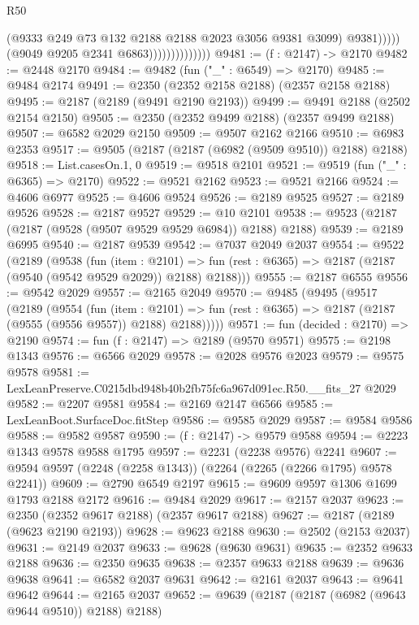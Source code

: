 \begin{lexlean}{R50}
\begin{coremodule}
                                        (@9333 @249 @73 @132 @2188 @2188 @2023 @3056 @9381 @3099)
                                        @9381)))))
                              (@9049 @9205 @2341 @6863))))))))))))))
@9481 := (f : @2147) -> @2170
@9482 := @2448 @2170
@9484 := @9482 (fun ("_" : @6549) => @2170)
@9485 := @9484 @2174
@9491 := @2350 (@2352 @2158 @2188) (@2357 @2158 @2188)
@9495 := @2187 (@2189 (@9491 @2190 @2193))
@9499 := @9491 @2188 (@2502 @2154 @2150)
@9505 := @2350 (@2352 @9499 @2188) (@2357 @9499 @2188)
@9507 := @6582 @2029 @2150
@9509 := @9507 @2162 @2166
@9510 := @6983 @2353
@9517 := @9505 (@2187 (@2187 (@6982 (@9509 @9510)) @2188) @2188)
@9518 := List.casesOn.{1, 0}
@9519 := @9518 @2101
@9521 := @9519 (fun ("_" : @6365) => @2170)
@9522 := @9521 @2162
@9523 := @9521 @2166
@9524 := @4606 @6977
@9525 := @4606 @9524
@9526 := @2189 @9525
@9527 := @2189 @9526
@9528 := @2187 @9527
@9529 := @10 @2101
@9538 := @9523 (@2187 (@2187 (@9528 (@9507 @9529 @9529 @6984)) @2188) @2188)
@9539 := @2189 @6995
@9540 := @2187 @9539
@9542 := @7037 @2049 @2037
@9554 := @9522
    (@2189
      (@9538
        (fun (item : @2101) =>
        fun (rest : @6365) => @2187 (@2187 (@9540 (@9542 @9529 @2029)) @2188) @2188)))
@9555 := @2187 @6555
@9556 := @9542 @2029
@9557 := @2165 @2049
@9570 := @9485
    (@9495
      (@9517
        (@2189
          (@9554
            (fun (item : @2101) =>
            fun (rest : @6365) => @2187 (@2187 (@9555 (@9556 @9557)) @2188) @2188)))))
@9571 := fun (decided : @2170) => @2190
@9574 := fun (f : @2147) => @2189 (@9570 @9571)
@9575 := @2198 @1343
@9576 := @6566 @2029
@9578 := @2028 @9576 @2023
@9579 := @9575 @9578
@9581 := LexLeanPreserve.C0215dbd948b40b2fb75fc6a967d091ec.R50.__fits_27 @2029
@9582 := @2207 @9581
@9584 := @2169 @2147 @6566
@9585 := LexLeanBoot.SurfaceDoc.fitStep
@9586 := @9585 @2029
@9587 := @9584 @9586
@9588 := @9582 @9587
@9590 := (f : @2147) -> @9579 @9588
@9594 := @2223 @1343 @9578 @9588 @1795
@9597 := @2231 (@2238 @9576) @2241
@9607 := @9594 @9597 (@2248 (@2258 @1343)) (@2264 (@2265 (@2266 @1795) @9578 @2241))
@9609 := @2790 @6549 @2197
@9615 := @9609 @9597 @1306 @1699 @1793 @2188 @2172
@9616 := @9484 @2029
@9617 := @2157 @2037
@9623 := @2350 (@2352 @9617 @2188) (@2357 @9617 @2188)
@9627 := @2187 (@2189 (@9623 @2190 @2193))
@9628 := @9623 @2188
@9630 := @2502 (@2153 @2037)
@9631 := @2149 @2037
@9633 := @9628 (@9630 @9631)
@9635 := @2352 @9633 @2188
@9636 := @2350 @9635
@9638 := @2357 @9633 @2188
@9639 := @9636 @9638
@9641 := @6582 @2037 @9631
@9642 := @2161 @2037
@9643 := @9641 @9642
@9644 := @2165 @2037
@9652 := @9639 (@2187 (@2187 (@6982 (@9643 @9644 @9510)) @2188) @2188)

\end{coremodule}
\end{lexlean}
